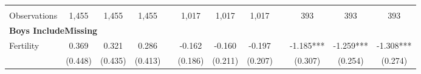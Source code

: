 \begin{landscape}
\begin{table}[htpb!]
\begin{center}
\begin{tabular}{lcccp{2mm}cccp{2mm}ccc}
\begin{footnotesize}\end{footnotesize}&\begin{footnotesize}\end{footnotesize}&\begin{footnotesize}\end{footnotesize}&\begin{footnotesize}\end{footnotesize}&\begin{footnotesize}\end{footnotesize}&\begin{footnotesize}\end{footnotesize}&\begin{footnotesize}\end{footnotesize}&\begin{footnotesize}\end{footnotesize}&\begin{footnotesize}\end{footnotesize}&\begin{footnotesize}\end{footnotesize}&\begin{footnotesize}\end{footnotesize}&\begin{footnotesize}\end{footnotesize}\\Observations&1,455&1,455&1,455&&1,017&1,017&1,017&&393&393&393\\
\multicolumn{12}{l}{\textbf{Boys IncludeMissing}}\\ 
Fertility&0.369&0.321&0.286&&-0.162&-0.160&-0.197&&-1.185***&-1.259***&-1.308***\\
&(0.448)&(0.435)&(0.413)&&(0.186)&(0.211)&(0.207)&&(0.307)&(0.254)&(0.274)\\

\end{tabular}
\end{center}
\end{table}
\end{landscape}
